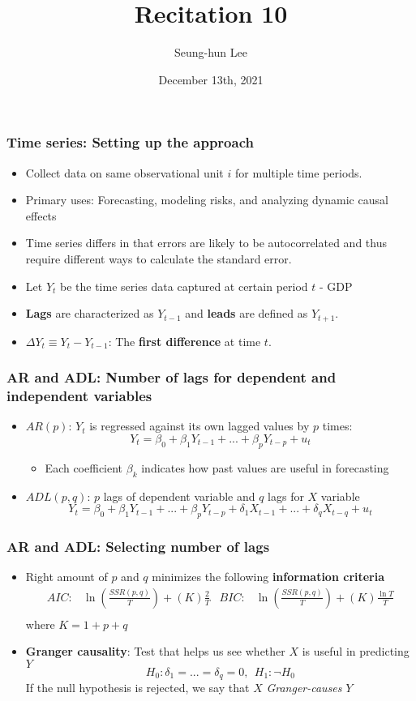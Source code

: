 \documentclass[aspectratio=169]{beamer}
\title[Recitation 10]{Recitation 10} %
\author[Seung-hun Lee]{Seung-hun Lee}
\institute[Columbia University]{Columbia University}
\date[December 13th, 2021]{December 13th, 2021}
\begin{document}
\begin{frame}
\titlepage
\end{frame}

\begin{frame}
\frametitle{Time series: Setting up the approach}
\begin{itemize}
\item Collect data on same observational unit $i$ for multiple time periods. 
\item Primary uses: Forecasting, modeling risks, and analyzing dynamic causal effects
\item Time series differs in that errors are likely to be autocorrelated and thus require different ways to calculate the standard error. 
\item Let $Y_t$ be the time series data captured at certain period $t$ - GDP
\item \textbf{Lags} are characterized as $Y_{t-1}$ and \textbf{leads} are defined as $Y_{t+1}$. 
\item $\Delta Y_{t}\equiv Y_t-Y_{t-1}$: The \textbf{first difference} at time $t$. 
\end{itemize}
\end{frame}

\begin{frame}
\frametitle{AR and ADL: Number of lags for dependent and independent variables }
\begin{itemize}
\item $AR(p)$: $Y_t$ is regressed against its own lagged values by $p$ times: 
\[
Y_t = \beta_0+\beta_1Y_{t-1}+...+\beta_pY_{t-p}+u_t 
\]
\begin{itemize}
\item Each coefficient $\beta_k$ indicates how past values are useful in forecasting
\end{itemize}
\item $ADL(p,q)$: $p$ lags of dependent variable and $q$ lags for $X$ variable
\[
Y_t = \beta_0+\beta_1Y_{t-1}+...+\beta_p Y_{t-p} + \delta_1 X_{t-1}+...+\delta_qX_{t-q}+u_t 
\]
\end{itemize}
\end{frame}

\begin{frame}
\frametitle{AR and ADL: Selecting number of lags}
\begin{itemize}
\item Right amount of $p$ and $q$ minimizes the following \textbf{information criteria}
\[
\begin{aligned}
AIC:& \ln\left(\frac{SSR(p,q)}{T}\right)+(K)\frac{2}{T}&
BIC:& \ln\left(\frac{SSR(p,q)}{T}\right)+(K)\frac{\ln{T}}{T}\\
\end{aligned}
\]
where $K=1+p+q$
\item \textbf{Granger causality}: Test that helps us see whether $X$ is useful in predicting $Y$
\[
H_0: \delta_1 = ... = \delta_q=0, \ \ H_1: \lnot H_0
\]
If the null hypothesis is rejected, we say that $X$ \textit{Granger-causes} $Y$
\end{itemize}
\end{frame}
\end{document}
